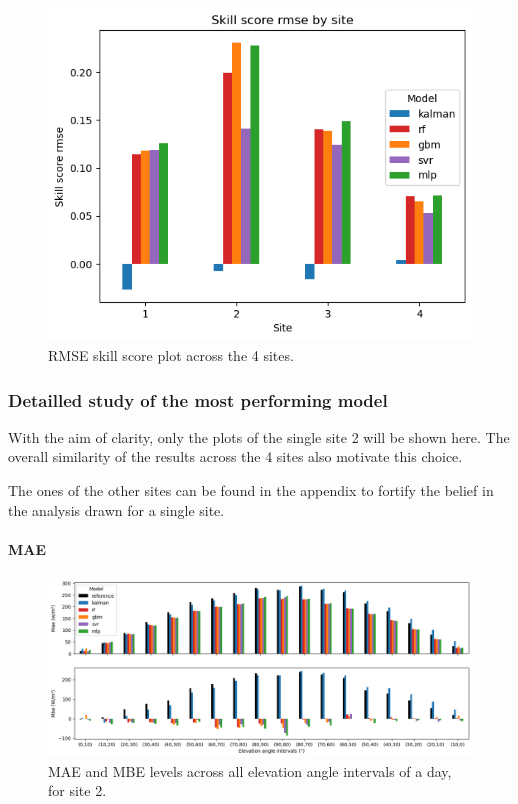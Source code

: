 \begin{figure}[htb!]
    \centering
    \includegraphics[width=0.75\columnwidth]{figures/first_study/ss_rmse.png}
    \caption{RMSE skill score plot across the 4 sites.}
\end{figure}

\subsubsection{Detailled study of the most performing model}
With the aim of clarity, only the plots of the single site 2 will be shown here.
The overall similarity of the results across the 4 sites also motivate this choice.

The ones of the other sites can be found in the appendix to fortify the belief in the analysis drawn for a single site.

\paragraph{MAE}
\begin{figure}[htb!]
    \centering
    \includegraphics[width=\columnwidth]{figures/first_study/mae_mbe_site2.png}
\caption{MAE and MBE levels across all elevation angle intervals of a day, for site 2.}
\end{figure}

